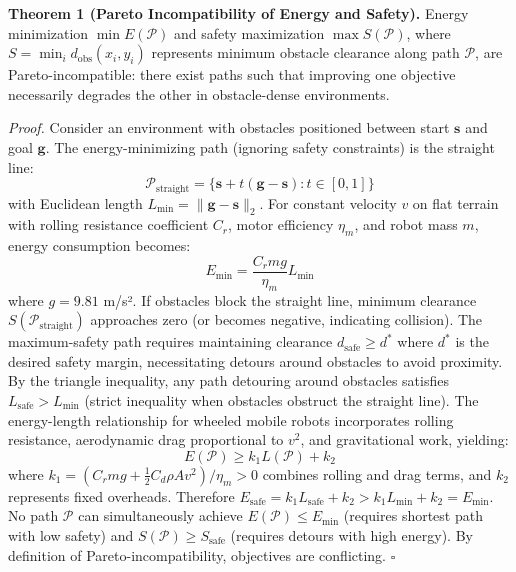 \documentclass[pdflatex,sn-nature]{sn-jnl}%
\begin{document}
\textbf{Theorem 1 (Pareto Incompatibility of Energy and Safety).} Energy minimization $\min E(\mathcal{P})$ and safety maximization $\max S(\mathcal{P})$, where $S = \min_{i} d_{\text{obs}}(x_i, y_i)$ represents minimum obstacle clearance along path $\mathcal{P}$, are Pareto-incompatible: there exist paths such that improving one objective necessarily degrades the other in obstacle-dense environments.

\textit{Proof.} Consider an environment with obstacles positioned between start $\mathbf{s}$ and goal $\mathbf{g}$. The energy-minimizing path (ignoring safety constraints) is the straight line:
\begin{equation}
\mathcal{P}_{\text{straight}} = \{ \mathbf{s} + t(\mathbf{g} - \mathbf{s}) : t \in [0,1] \}
\label{eq:path_straight}
\end{equation}
with Euclidean length $L_{\text{min}} = \|\mathbf{g} - \mathbf{s}\|_2$. For constant velocity $v$ on flat terrain with rolling resistance coefficient $C_r$, motor efficiency $\eta_m$, and robot mass $m$, energy consumption becomes:
\begin{equation}
E_{\text{min}} = \frac{C_r m g}{\eta_m} L_{\text{min}}
\label{eq:energy_min}
\end{equation}
where $g = 9.81$ m/s². If obstacles block the straight line, minimum clearance $S(\mathcal{P}_{\text{straight}})$ approaches zero (or becomes negative, indicating collision). The maximum-safety path requires maintaining clearance $d_{\text{safe}} \geq d^*$ where $d^*$ is the desired safety margin, necessitating detours around obstacles to avoid proximity. By the triangle inequality, any path detouring around obstacles satisfies $L_{\text{safe}} > L_{\text{min}}$ (strict inequality when obstacles obstruct the straight line). The energy-length relationship for wheeled mobile robots incorporates rolling resistance, aerodynamic drag proportional to $v^2$, and gravitational work, yielding:
\begin{equation}
E(\mathcal{P}) \geq k_1 L(\mathcal{P}) + k_2
\label{eq:energy_length}
\end{equation}
where $k_1 = (C_r m g + \frac{1}{2} C_d \rho A v^2) / \eta_m > 0$ combines rolling and drag terms, and $k_2$ represents fixed overheads. Therefore $E_{\text{safe}} = k_1 L_{\text{safe}} + k_2 > k_1 L_{\text{min}} + k_2 = E_{\text{min}}$. No path $\mathcal{P}$ can simultaneously achieve $E(\mathcal{P}) \leq E_{\text{min}}$ (requires shortest path with low safety) and $S(\mathcal{P}) \geq S_{\text{safe}}$ (requires detours with high energy). By definition of Pareto-incompatibility, objectives are conflicting. $\square$
\end{document}
